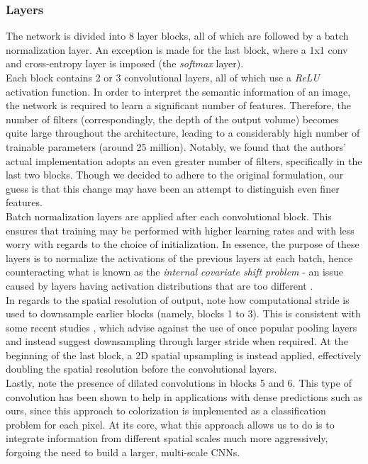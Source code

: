 \documentclass[twoside,twocolumn]{article}
\begin{document}
\subsubsection{Layers}
The network is divided into 8 layer blocks, all of which are followed by a batch normalization layer. An exception is made for the last block, where a 1x1 conv and cross-entropy layer is imposed (the \textit{softmax} layer). \\
Each block contains 2 or 3 convolutional layers, all of which use a \textit{ReLU} activation function. In order to interpret the semantic information of an image, the network is required to learn a significant number of features. Therefore, the number of filters (correspondingly, the depth of the output volume) becomes quite large throughout the architecture, leading to a considerably high number of trainable parameters (around 25 million). Notably, we found that the authors' actual implementation \cite{Zhang:github} adopts an even greater number of filters, specifically in the last two blocks. Though we decided to adhere to the original formulation, our guess is that this change may have been an attempt to distinguish even finer features.\\
Batch normalization layers are applied after each convolutional block. This ensures that training may be performed with higher learning rates and with less worry with regards to the choice of initialization. In essence, the purpose of these layers is to normalize the activations of the previous layers at each batch, hence counteracting what is known as the \textit{internal covariate shift problem} - an issue caused by layers having activation distributions that are too different \cite{Sergey:2015}.\\
In regards to the spatial resolution of output, note how computational stride is used to downsample earlier blocks (namely, blocks 1 to 3). This is consistent with some recent studies \cite{Jost:2015}, which advise against the use of once popular pooling layers and instead suggest downsampling through larger stride when required. At the beginning of the last block, a 2D spatial upsampling is instead applied, effectively doubling the spatial resolution before the convolutional layers. \\
Lastly, note the presence of dilated convolutions \cite{Fisher:2016} in blocks 5 and 6. This type of convolution has been shown to help in applications with dense predictions such as ours, since this approach to colorization is implemented as a classification problem for each pixel. At its core, what this approach allows us to do is to integrate information from different spatial scales much more aggressively,  forgoing the need to build a larger, multi-scale CNNs.
\end{document}
